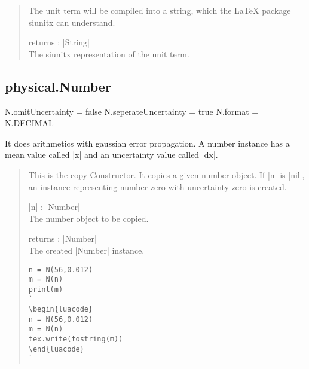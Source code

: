 \documentclass{ltxdoc}
\begin{document}
\begin{quote}
  The unit term will be compiled into a string, which the LaTeX package siunitx can understand.

  \begin{description}
  \item returns : |String|\\
    The siunitx representation of the unit term.
  \end{description}

\end{quote}





\newpage
\subsection{physical.Number}

\begin{luacode}
N.omitUncertainty = false
N.seperateUncertainty = true
N.format = N.DECIMAL
\end{luacode}

It does arithmetics with gaussian error propagation. A number instance has a mean value called |x| and an uncertainty value called |dx|.

\begin{quote}
  This is the copy Constructor. It copies a given number object. If |n| is |nil|, an instance representing number zero with uncertainty zero is created.

  \begin{description}
  \item |n| : |Number|\\
    The number object to be copied.

  \item returns : |Number|\\
    The created |Number| instance.
  \end{description}

\begin{lstlisting}
n = N(56,0.012)
m = N(n)
print(m)
`
\begin{luacode}
n = N(56,0.012)
m = N(n)
tex.write(tostring(m))
\end{luacode}
`
\end{lstlisting}

\end{quote}
\end{document}
